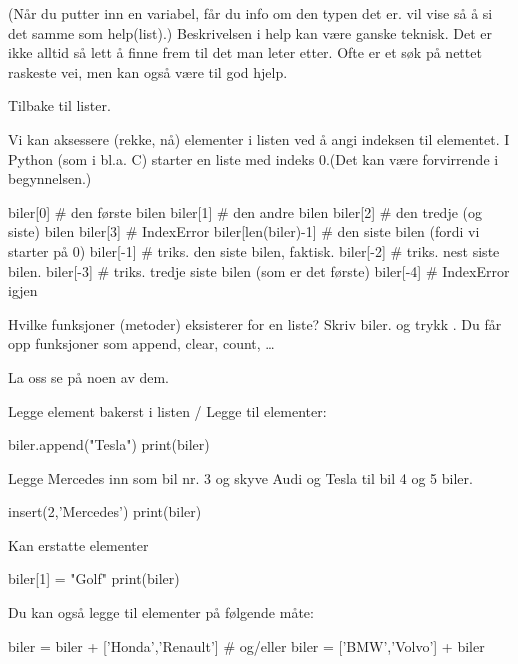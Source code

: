 (Når du putter inn en variabel, får du info om den typen det er. 
 vil vise så å si det samme som help(list).) Beskrivelsen i help kan være ganske teknisk. Det er ikke alltid så lett å finne frem til det man leter etter. Ofte er et søk på nettet raskeste vei, men  kan også være til god hjelp. 

Tilbake til lister.

Vi kan aksessere (rekke, nå) elementer i listen ved å angi indeksen til elementet. I Python (som i bl.a. C) starter en liste med indeks 0.(Det kan være forvirrende i begynnelsen.) 

\begin{usncodebox}
biler[0]       # den første bilen 
biler[1]       # den andre bilen
biler[2]       # den tredje (og siste) bilen
biler[3]       # IndexError
biler[len(biler)-1]   # den siste bilen (fordi vi starter på 0) 
biler[-1]      # triks. den siste bilen, faktisk. 
biler[-2]      # triks. nest siste bilen. 
biler[-3]      # triks. tredje siste bilen (som er det første)
biler[-4]      # IndexError igjen
\end{usncodebox}

Hvilke funksjoner (metoder) eksisterer for en liste? Skriv biler. og trykk . Du får opp funksjoner som append, clear, count, \ldots

La oss se på noen av dem. 

Legge element bakerst i listen / Legge til elementer:

\begin{usncodebox}
biler.append("Tesla")
print(biler)
\end{usncodebox}

Legge Mercedes inn som bil nr. 3 og skyve Audi og Tesla til bil 4 og 5 biler.

\begin{usncodebox}
insert(2,'Mercedes')
print(biler)
\end{usncodebox}

Kan erstatte elementer

\begin{usncodebox}
biler[1] = "Golf"
print(biler)
\end{usncodebox}

Du kan også legge til elementer på følgende måte:

\begin{usncodebox}
biler = biler + ['Honda','Renault']
# og/eller
biler = ['BMW','Volvo'] + biler
\end{usncodebox}

